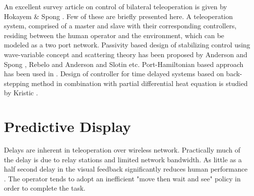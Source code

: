 An excellent survey article on control of bilateral teleoperation is given by Hokayem \& Spong \cite{hokayem2006bilateral}. Few of these are briefly presented here. A teleoperation system, comprised of a master and slave with their corresponding controllers, residing between the human operator and the environment, which  can be modeled as a two port network. Passivity based design of stabilizing control using  wave-variable concept and scattering theory has been proposed by Anderson and Spong \cite{anderson1989bilateral}, Rebelo \cite{rebelo2015time} and Anderson and Slotin \cite{niemeyer1991stable} etc.   Port-Hamiltonian  based approach has been used in \cite{stramigioli2010novel,stramigioli2005sampled}. Design of controller for time delayed systems  based on back-stepping method in combination with partial differential heat  equation is studied by  Kristic \cite{krstic2009delay}. 



\section{Predictive Display}
Delays are inherent in teleoperation over wireless network. Practically much of the delay is due to relay stations and limited  network bandwidth. As little as a half second delay in the visual feedback significantly reduces human performance \cite{chen2007human}. The operator tends to adopt an inefficient "move then wait and see" policy in order to complete the task.

